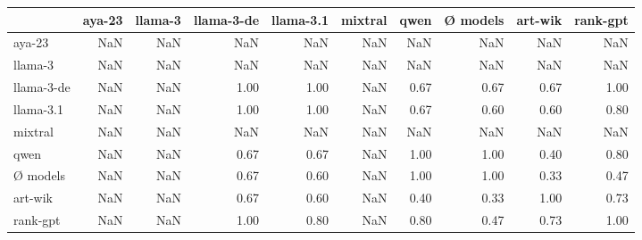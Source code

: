 \begin{tabular}{lrrrrrrrrr}
\toprule
 & aya-23 & llama-3 & llama-3-de & llama-3.1 & mixtral & qwen & Ø models & art-wik & rank-gpt \\
\midrule
aya-23 & NaN & NaN & NaN & NaN & NaN & NaN & NaN & NaN & NaN \\
llama-3 & NaN & NaN & NaN & NaN & NaN & NaN & NaN & NaN & NaN \\
llama-3-de & NaN & NaN & 1.00 & 1.00 & NaN & 0.67 & 0.67 & 0.67 & 1.00 \\
llama-3.1 & NaN & NaN & 1.00 & 1.00 & NaN & 0.67 & 0.60 & 0.60 & 0.80 \\
mixtral & NaN & NaN & NaN & NaN & NaN & NaN & NaN & NaN & NaN \\
qwen & NaN & NaN & 0.67 & 0.67 & NaN & 1.00 & 1.00 & 0.40 & 0.80 \\
Ø models & NaN & NaN & 0.67 & 0.60 & NaN & 1.00 & 1.00 & 0.33 & 0.47 \\
art-wik & NaN & NaN & 0.67 & 0.60 & NaN & 0.40 & 0.33 & 1.00 & 0.73 \\
rank-gpt & NaN & NaN & 1.00 & 0.80 & NaN & 0.80 & 0.47 & 0.73 & 1.00 \\
\bottomrule
\end{tabular}
